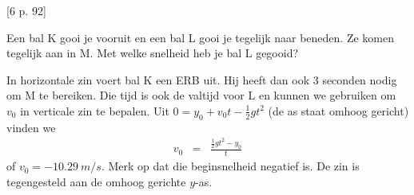 
\begin{exercise}




[6 p. 92]  
\begin{minipage}[t]{.5\textwidth}
Een bal K gooi je vooruit en een bal L gooi je tegelijk naar beneden. Ze komen tegelijk aan in M. Met welke snelheid heb je bal L gegooid?
\end{minipage}
\hfill
\begin{minipage}[t]{.4\textwidth}
	\raisebox{1ex-\height}{%
		\texttt{[image: 6p92]}} 
\end{minipage}
\begin{oplossing}
In horizontale zin voert bal K een ERB uit. Hij heeft dan ook 3 seconden nodig om M te bereiken. Die tijd is ook de valtijd voor L en kunnen we gebruiken om $v_0$ in verticale zin te bepalen. Uit $0=y_0+v_0t-\frac{1}{2}gt^2$ (de as staat omhoog gericht) vinden we 
\begin{eqnarray*}
v_0&=&\frac{\frac{1}{2}gt^2-y_0}{t}
\end{eqnarray*}
of $v_0=\SI{-10,29}{m/s}$. Merk op dat die beginsnelheid negatief is. De zin is tegengesteld aan de omhoog gerichte $y$-as.
\end{oplossing}

\end{exercise}
